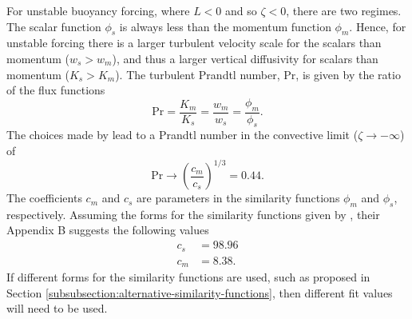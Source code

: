 For unstable buoyancy forcing, where $L<0$ and so $\zeta < 0$, there
are two regimes.  The scalar function $\phi_{s}$ is always less than
the momentum function $\phi_{m}$.  Hence, for unstable forcing there
is a larger turbulent velocity scale for the scalars than momentum
($w_{s} > w_{m}$), and thus a larger vertical diffusivity for scalars
than momentum ($K_{s} > K_{m}$).  The turbulent Prandtl number,
$\mbox{Pr}$, is given by the ratio of the flux functions
\begin{equation}
  \mbox{Pr} = \frac{K_{m}}{K_{s}} = \frac{w_{m}}{w_{s}} = \frac{\phi_{m}}{\phi_{s}}.
\label{eq:prandtl-number}
\end{equation}
The choices made by \cite{LargeKPP} lead to a Prandtl number in the
convective limit ($\zeta \rightarrow -\infty$) of 
\begin{equation}
 \mbox{Pr}  \rightarrow \left( \frac{c_{m}}{c_{s}} \right)^{1/3} = 0.44.
\label{eq:convective-limit-prandtl}
\end{equation}
The coefficients $c_{m}$ and $c_{s}$ are parameters in the similarity
functions $\phi_{m}$ and $\phi_{s}$, respectively.  Assuming the forms
for the similarity functions given by \cite{LargeKPP}, their Appendix
B suggests the following values
\begin{subequations}
\begin{align}
  c_{s} &=  98.96 \\
\label{eq:cs-defined}
  c_{m} &= 8.38.
\end{align}
\end{subequations}
If different forms for the similarity functions are used, such as
proposed in Section
\ref{subsubsection:alternative-similarity-functions}, then different
fit values will need to be used.


